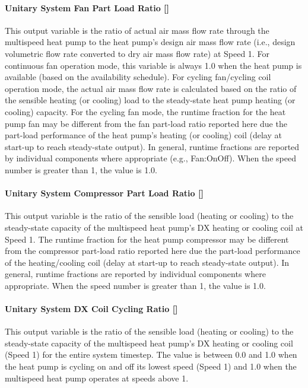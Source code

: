 \paragraph{Unitary System Fan Part Load Ratio {[]}}\label{unitary-system-fan-part-load-ratio-4}

This output variable is the ratio of actual air mass flow rate through the multispeed heat pump to the heat pump's design air mass flow rate (i.e., design volumetric flow rate converted to dry air mass flow rate) at Speed 1. For continuous fan operation mode, this variable is always 1.0 when the heat pump is available (based on the availability schedule). For cycling fan/cycling coil operation mode, the actual air mass flow rate is calculated based on the ratio of the sensible heating (or cooling) load to the steady-state heat pump heating (or cooling) capacity. For the cycling fan mode, the runtime fraction for the heat pump fan may be different from the fan part-load ratio reported here due the part-load performance of the heat pump's heating (or cooling) coil (delay at start-up to reach steady-state output). In general, runtime fractions are reported by individual components where appropriate (e.g., Fan:OnOff). When the speed number is greater than 1, the value is 1.0.

\paragraph{Unitary System Compressor Part Load Ratio {[]}}\label{unitary-system-compressor-part-load-ratio-3}

This output variable is the ratio of the sensible load (heating or cooling) to the steady-state capacity of the multispeed heat pump's DX heating or cooling coil at Speed 1. The runtime fraction for the heat pump compressor may be different from the compressor part-load ratio reported here due the part-load performance of the heating/cooling coil (delay at start-up to reach steady-state output). In general, runtime fractions are reported by individual components where appropriate. When the speed number is greater than 1, the value is 1.0.

\paragraph{Unitary System DX Coil Cycling Ratio {[]}}\label{unitary-system-dx-coil-cycling-ratio-1}

This output variable is the ratio of the sensible load (heating or cooling) to the steady-state capacity of the multispeed heat pump's DX heating or cooling coil (Speed 1) for the entire system timestep. The value is between 0.0 and 1.0 when the heat pump is cycling on and off its lowest speed (Speed 1) and 1.0 when the multispeed heat pump operates at speeds above 1.

